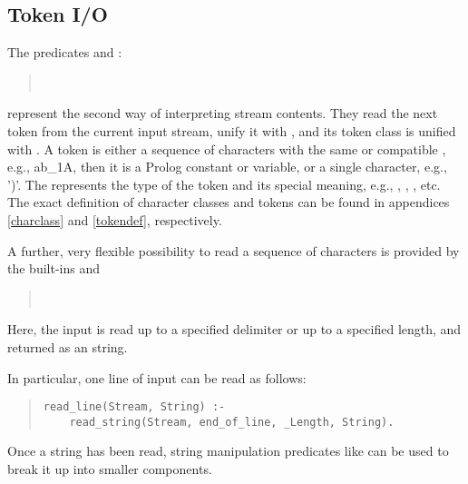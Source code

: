 \subsection{Token I/O}
The predicates
 and
:
\begin{quote}
\\
\end{quote}
represent the second way of interpreting stream contents.
They read the next token from the current
input stream, unify it with ,
and its token class is unified with .
A token is either a sequence of characters with the same or compatible
, e.g., ab_1A, then it is a Prolog constant
or variable, or a single character, e.g., ')'.
The  represents the type of the token and
its special meaning, e.g., , ,
, etc.
The exact definition of character classes and tokens can be found in
appendices \ref{charclass} and \ref{tokendef}, respectively.

A further, very flexible possibility to read a sequence of
characters is provided by the built-ins
 and
\begin{quote}
\\
\end{quote}
Here, the input is read up to a specified delimiter or up to a specified
length, and returned as an {\eclipse} string.

In particular, one line of input can be read as follows:
\begin{quote}
\begin{verbatim}
read_line(Stream, String) :-
    read_string(Stream, end_of_line, _Length, String).
\end{verbatim}
\end{quote}
Once a string has been read, string manipulation predicates like
can be used to break it up into smaller components.


